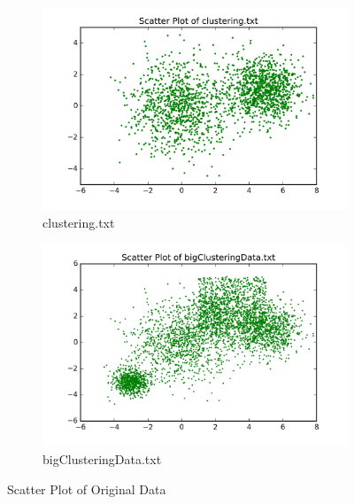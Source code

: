 \begin{figure}[H]
\centering
\centering
        \begin{subfigure}[b]{0.49\textwidth}
            \centering
            \includegraphics[width=\textwidth]{./figures/clustering_scatter.png}
            \caption{clustering.txt}\label{fig:16a}
        \end{subfigure}
        \hfill
        \begin{subfigure}[b]{0.49\textwidth}  
            \centering 
            \includegraphics[width=\textwidth]{./figures/bigClustering_scatter.png}
            \caption{bigClusteringData.txt}\label{fig:16b}
        \end{subfigure}
\caption{Scatter Plot of Original Data}
\label{fig:clusters} 
\end{figure}

